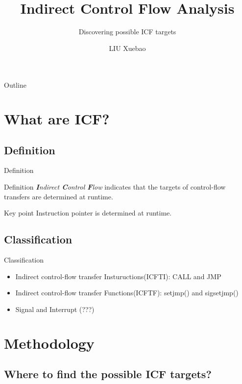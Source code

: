 \documentclass{beamer}
\title
{Indirect Control Flow Analysis}
\subtitle
{Discovering possible ICF targets}
\author
{LIU Xuebao}
\institute
{Institue of Computing Technology}
\begin{document}
\begin{frame}
    \titlepage
\end{frame}

\begin{frame}{Outline}
    \tableofcontents
\end{frame}

\section{What are ICF?}

\subsection{Definition}

\begin{frame}{Definition}
    \begin{block}{Definition}
        \emph{\textbf{I}ndirect \textbf{C}ontrol \textbf{F}low} indicates that
        the targets of control-flow transfers are determined at \alert{runtime}.
    \end{block}

    \begin{block}{Key point}
        Instruction pointer is determined at runtime.
    \end{block}
\end{frame}

\subsection{Classification}

\begin{frame}{Classification}
    \begin{itemize}
        \item
            Indirect control-flow transfer Instuructions(ICFTI): CALL and JMP
        \item
            Indirect control-flow transfer Functions(ICFTF): setjmp() and sigsetjmp()
        \item
            Signal and Interrupt (???)
    \end{itemize}
\end{frame}

\section{Methodology}
\subsection{Where to find the possible ICF targets?}
\end{document}
